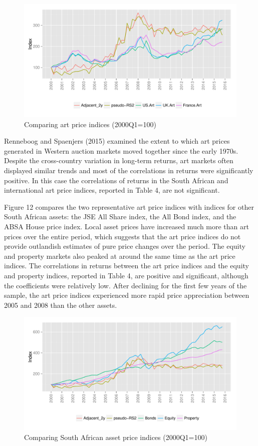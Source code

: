 \documentclass[12pt,]{article}
\begin{document}
\begin{figure}[htbp]
\centering
\includegraphics{Art_Price_Indices_3_files/figure-latex/figure11-1.pdf}
\caption{Comparing art price indices (2000Q1=100)}
\end{figure}

Renneboog and Spaenjers (2015) examined the extent to which art prices
generated in Western auction markets moved together since the early
1970s. Despite the cross-country variation in long-term returns, art
markets often displayed similar trends and most of the correlations in
returns were significantly positive. In this case the correlations of
returns in the South African and international art price indices,
reported in Table 4, are not significant.

Figure 12 compares the two representative art price indices with indices
for other South African assets: the JSE All Share index, the All Bond
index, and the ABSA House price index. Local asset prices have increased
much more than art prices over the entire period, which suggests that
the art price indices do not provide outlandish estimates of pure price
changes over the period. The equity and property markets also peaked at
around the same time as the art price indices. The correlations in
returns between the art price indices and the equity and property
indices, reported in Table 4, are positive and significant, although the
coefficients were relatively low. After declining for the first few
years of the sample, the art price indices experienced more rapid price
appreciation between 2005 and 2008 than the other assets.

\begin{figure}[htbp]
\centering
\includegraphics{Art_Price_Indices_3_files/figure-latex/figure12-1.pdf}
\caption{Comparing South African asset price indices (2000Q1=100)}
\end{figure}
\end{document}
